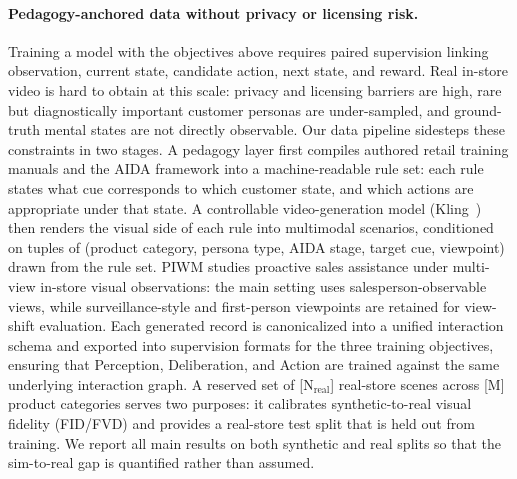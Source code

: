 \documentclass{article}
\begin{document}
\paragraph{Pedagogy-anchored data without privacy or licensing risk.}
Training a model with the objectives above requires paired supervision linking observation, current state, candidate action, next state, and reward. Real in-store video is hard to obtain at this scale: privacy and licensing barriers are high, rare but diagnostically important customer personas are under-sampled, and ground-truth mental states are not directly observable. Our data pipeline sidesteps these constraints in two stages. A pedagogy layer first compiles authored retail training manuals and the AIDA framework into a machine-readable rule set: each rule states what cue corresponds to which customer state, and which actions are appropriate under that state. A controllable video-generation model (Kling~\cite{Kling}) then renders the visual side of each rule into multimodal scenarios, conditioned on tuples of (product category, persona type, AIDA stage, target cue, viewpoint) drawn from the rule set. PIWM studies proactive sales assistance under multi-view in-store visual observations: the main setting uses salesperson-observable views, while surveillance-style and first-person viewpoints are retained for view-shift evaluation. Each generated record is canonicalized into a unified interaction schema and exported into supervision formats for the three training objectives, ensuring that Perception, Deliberation, and Action are trained against the same underlying interaction graph. A reserved set of [N$_\text{real}$] real-store scenes across [M] product categories serves two purposes: it calibrates synthetic-to-real visual fidelity (FID/FVD) and provides a real-store test split that is held out from training. We report all main results on both synthetic and real splits so that the sim-to-real gap is quantified rather than assumed.
\end{document}
